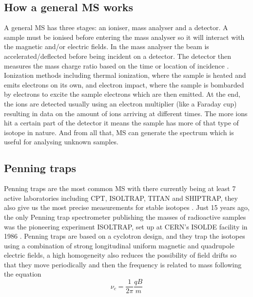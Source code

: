 \subsection{How a general MS works}
A general MS has three stages: an ioniser, mass analyser and a detector.
A sample must be ionised before entering the mass analyser so it will interact with the magnetic and/or electric fields.
In the mass analyser the beam is accelerated/deflected before being incident on a detector.
The detector then measures the mass charge ratio based on the time or location of incidence \cite{noauthor_mass_nodate}.
Ionization methods including thermal ionization, where the sample is heated and emits electrons on its own, and electron impact, where the sample is bombarded by electrons to excite the sample electrons which are then emitted.
At the end, the ions are detected usually using an electron multiplier (like a Faraday cup) resulting in data on the amount of ions arriving at different times.
The more ions hit a certain part of the detector it means the sample has more of that type of isotope in nature.
And from all that, MS can generate the spectrum which is useful for analysing unknown samples.

\subsection{Penning traps}
Penning traps are the most common MS with there currently being at least 7 active laboratories including CPT, ISOLTRAP, TITAN and SHIPTRAP, they also give us the most precise measurements for stable isotopes \cite{huang_ame_2021}.
Just 15 years ago, the only Penning trap spectrometer publishing the masses of radioactive samples was the pioneering experiment ISOLTRAP, set up at CERN’s ISOLDE facility in 1986 \cite{lunney_new_2019}.
Penning traps are based on a cyclotron design, and they trap the isotopes using a combination of strong longitudinal uniform magnetic and quadrupole electric fields, a high homogeneity also reduces the possibility of field drifts so that they move periodically and then the frequency is related to mass following the equation
\begin{equation}
    \nu_c = \frac{1}{2\pi}\frac{qB}{m}
\end{equation}

